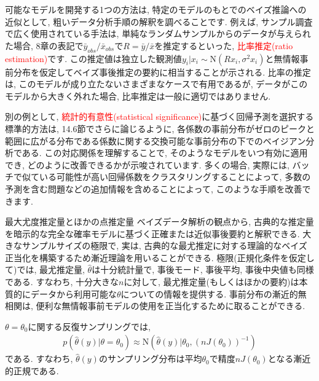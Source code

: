 \documentclass[10pt,dvipdfmx,a4]{beamer}
\newcommand{\eqn}[1]{\begin{align*}#1\end{align*}}
\newcommand{\tcr}[1]{\textcolor{red}{#1}}
\begin{document}
\begin{frame}
可能なモデルを開発する1つの方法は, 特定のモデルのもとでのベイズ推論への近似として, 粗いデータ分析手順の解釈を調べることです.
例えば, サンプル調査で広く使用されている手法は, 単純なランダムサンプルからのデータが与えられた場合, 8章の表記で$\bar{y}_{obs}/\bar{x}_{obs}$で$R=\bar{y}/\bar{x}$を推定するといった, \tcr{比率推定(ratio estimation)}です.
この推定値は独立した観測値$y_i|x_i\sim\text{N}(Rx_i, \sigma^2x_i)$と無情報事前分布を仮定してベイズ事後推定の要約に相当することが示される.
比率の推定は, このモデルが成り立たないさまざまなケースで有用であるが, データがこのモデルから大きく外れた場合, 比率推定は一般に適切ではありません.

別の例として, \tcr{統計的有意性(statistical significance)}に基づく回帰予測を選択する標準的方法は, 14.6節でさらに論じるように, 各係数の事前分布がゼロのピークと範囲に広がる分布である係数に関する交換可能な事前分布の下でのベイジアン分析である.
この対応関係を理解することで, そのようなモデルをいつ有効に適用でき, どのように改善できるかが示唆されています.
多くの場合, 実際には, バッチで似ている可能性が高い回帰係数をクラスタリングすることによって, 多数の予測を含む問題などの追加情報を含めることによって, このような手順を改善できます.
\end{frame}


\begin{frame}{最大尤度推定量とほかの点推定量}
ベイズデータ解析の観点から, 古典的な推定量を暗示的な完全な確率モデルに基づく正確または近似事後要約と解釈できる.
大きなサンプルサイズの極限で, 実は, 古典的な最尤推定に対する理論的なベイズ正当化を構築するため漸近理論を用いることができる.
極限(正規化条件を仮定して)では, 最尤推定量, $\hat{\theta}$は十分統計量で, 事後モード, 事後平均, 事後中央値も同様である.
すなわち, 十分大きな$n$に対して, 最尤推定量(もしくはほかの要約)は本質的にデータから利用可能な$\theta$についての情報を提供する.
事前分布の漸近的無相関は, 便利な無情報事前モデルの使用を正当化するために取ることができる.

$\theta=\theta_0$に関する反復サンプリングでは,
\eqn{p(\hat{\theta}(y)|\theta=\theta_0)\approx\text{N}(\hat{\theta}(y)|\theta_0, (nJ(\theta_0))^{-1})}
である.
すなわち, $\hat{\theta}(y)$のサンプリング分布は平均$\theta_0$で精度$nJ(\theta_0)$となる漸近的正規である.
\end{frame}

\end{document}
